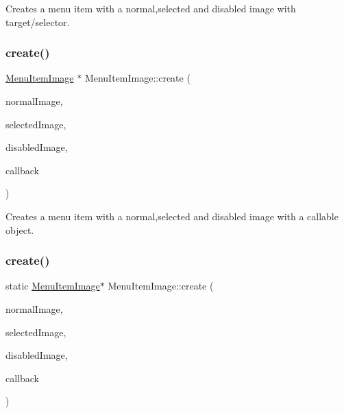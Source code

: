 Creates a menu item with a normal,selected and disabled image with target/selector. \mbox{\label{classMenuItemImage_a3b77e01f2a8d9214797be3bfd6597a25}} 
\subsubsection{\texorpdfstring{create()}{create()}\hspace{0.1cm}{\footnotesize\ttfamily [13/14]}}
{\footnotesize\ttfamily \hyperlink{classMenuItemImage}{Menu\+Item\+Image} $\ast$ Menu\+Item\+Image\+::create (\begin{DoxyParamCaption}\item[{const std\+::string \&}]{normal\+Image,  }\item[{const std\+::string \&}]{selected\+Image,  }\item[{const std\+::string \&}]{disabled\+Image,  }\item[{const cc\+Menu\+Callback \&}]{callback }\end{DoxyParamCaption})\hspace{0.3cm}{\ttfamily [static]}}

Creates a menu item with a normal,selected and disabled image with a callable object. \mbox{\label{classMenuItemImage_aa4bbe8466bf9fd726ba7283058dd975b}} 
\subsubsection{\texorpdfstring{create()}{create()}\hspace{0.1cm}{\footnotesize\ttfamily [14/14]}}
{\footnotesize\ttfamily static \hyperlink{classMenuItemImage}{Menu\+Item\+Image}$\ast$ Menu\+Item\+Image\+::create (\begin{DoxyParamCaption}\item[{const std\+::string \&}]{normal\+Image,  }\item[{const std\+::string \&}]{selected\+Image,  }\item[{const std\+::string \&}]{disabled\+Image,  }\item[{const cc\+Menu\+Callback \&}]{callback }\end{DoxyParamCaption})\hspace{0.3cm}{\ttfamily [static]}}

